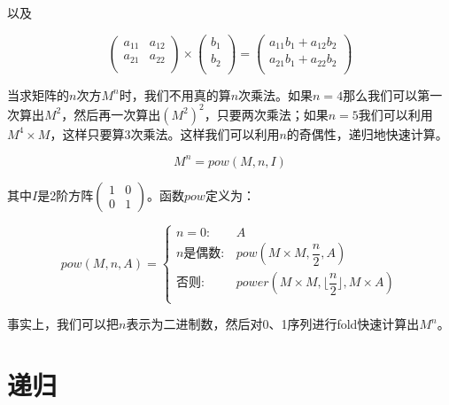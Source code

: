 \documentclass[UTF8]{article}
\begin{document}
\begin{enumerate}
以及

\[
\begin{pmatrix}
a_{11} & a_{12} \\
a_{21} & a_{22} \\
\end{pmatrix}
\times
\begin{pmatrix}
b_{1} \\
b_{2} \\
\end{pmatrix}
=
\begin{pmatrix}
a_{11} b_{1} + a_{12} b_{2} \\
a_{21} b_{1} + a_{22} b_{2} \\
\end{pmatrix}
\]

当求矩阵的$n$次方$M^n$时，我们不用真的算$n$次乘法。如果$n=4$那么我们可以第一次算出$M^2$，然后再一次算出$(M^2)^2$，只要两次乘法；如果$n = 5$我们可以利用$M^4 \times M$，这样只要算3次乘法。这样我们可以利用$n$的奇偶性，递归地快速计算。

\[
M^n = pow(M, n, I)
\]

其中$I$是2阶方阵$\displaystyle \begin{pmatrix} 1 & 0 \\ 0 & 1\end{pmatrix}$。函数$pow$定义为：

\[
pow(M, n, A) = \begin{cases}
n = 0: & A \\
n\text{是偶数}: & pow(M \times M, \dfrac{n}{2}, A) \\
\text{否则}: & power(M \times M, \lfloor \dfrac{n}{2} \rfloor, M \times A)\\
\end{cases}
\]

事实上，我们可以把$n$表示为二进制数，然后对0、1序列进行fold快速计算出$M^n$。

\end{enumerate}

\section{递归}
\end{document}

